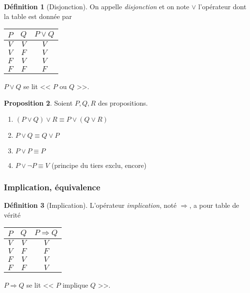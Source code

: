 \documentclass[11pt]{article}
\theoremstyle{definition}
\newtheorem{defn}{Définition}[section]
\newtheorem{prop}[defn]{Proposition}
\theoremstyle{remark}
\begin{document}
\begin{defn}[Disjonction]
On appelle \textit{disjonction} et on note $\lor$ l'opérateur dont la table est donnée par
\begin{table}[ht]
\centering
\begin{tabular}{|c|c|c|}\hline
$P$ & $Q$ & $P\lor Q$ \\ \hline
$V$ & $V$ & $V$ \\\hline
$V$ & $F$ & $V$ \\\hline
$F$ & $V$ & $V$ \\\hline
$F$ & $F$ & $F$ \\\hline
\end{tabular}
\end{table}

$P\lor Q$ se lit << $P$ ou $Q$ >>.
\end{defn}

\begin{prop}
Soient $P,Q,R$ des propositions.
\begin{enumerate}
\item $(P\lor Q)\lor R \equiv P\lor (Q\lor R)$
\item $P\lor Q \equiv Q\lor P$
\item $P\lor P\equiv P$
\item $P\lor \neg P\equiv V$ (principe du tiers exclu, encore)
\end{enumerate}
\end{prop}



\subsubsection{Implication, équivalence}

\begin{defn}[Implication]
L'opérateur \textit{implication}, noté $\Rightarrow$, a pour table de vérité

\begin{table}[ht]
\centering
\begin{tabular}{|c|c|c|}\hline
$P$ & $Q$ & $P\Rightarrow Q$ \\ \hline
$V$ & $V$ & $V$ \\\hline
$V$ & $F$ & $F$ \\\hline
$F$ & $V$ & $V$ \\\hline
$F$ & $F$ & $V$ \\\hline
\end{tabular}
\end{table}

$P\Rightarrow Q$ se lit << $P$ implique $Q$ >>.
\end{defn}
\end{document}
